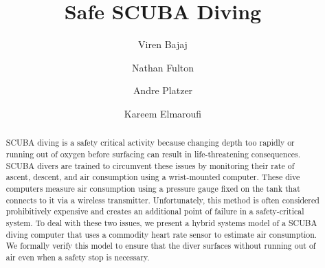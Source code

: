 \documentclass[sigconf,screen]{acmart}
\begin{document}
%
\title{Safe SCUBA Diving}

%
\author{Viren Bajaj}

\author{Nathan Fulton}


\author{Andre Platzer}

\author{Kareem Elmaroufi}
 


%
\renewcommand{\shortauthors}{Trovato and Tobin, et al.}

%
\begin{abstract}
SCUBA diving is a safety critical activity because changing depth too rapidly or running out of oxygen before surfacing can result in life-threatening consequences. SCUBA divers are trained to circumvent these issues by monitoring their rate of ascent, descent, and air consumption using a wrist-mounted computer. 
These dive computers measure air consumption using a pressure gauge fixed on the tank that connects to it via a wireless transmitter. Unfortunately, this method is often considered prohibitively expensive and creates an additional point of failure in a safety-critical system.
To deal with these two issues, we present a hybrid systems model of a SCUBA diving computer that uses a commodity heart rate sensor to estimate air consumption. We formally verify this model to ensure that the diver surfaces without running out of air even when a safety stop is necessary.
\end{abstract}
\end{document}
